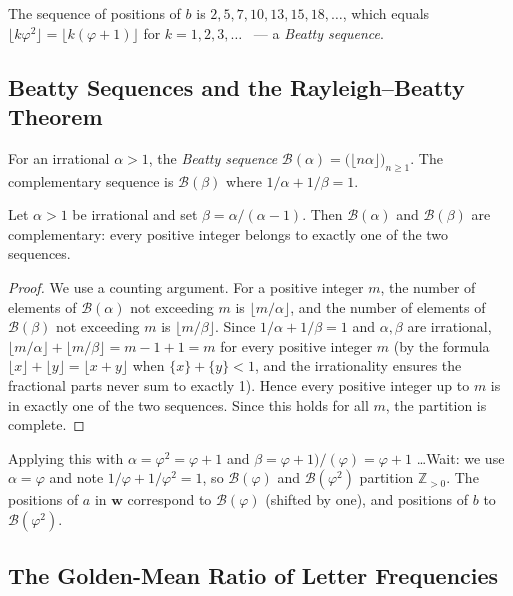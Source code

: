 The sequence of positions of \(b\) is \(2,5,7,10,13,15,18,\ldots\),
which equals \(\lfloor k\varphi^2 \rfloor = \lfloor k(\varphi+1) \rfloor\)
for \(k=1,2,3,\ldots\) \ — a \emph{Beatty sequence}.

\subsection{Beatty Sequences and the Rayleigh--Beatty Theorem}
\label{subsec:ch19-beatty}

For an irrational \(\alpha>1\), the \emph{Beatty sequence}
\(\mathcal{B}(\alpha) = \bigl(\lfloor n\alpha \rfloor\bigr)_{n\geq 1}\).
The complementary sequence is \(\mathcal{B}(\beta)\) where
\(1/\alpha + 1/\beta = 1\).

\begin{theorem}\label{thm:rayleigh-beatty}
  Let \(\alpha>1\) be irrational and set \(\beta = \alpha/(\alpha-1)\).
  Then \(\mathcal{B}(\alpha)\) and \(\mathcal{B}(\beta)\) are
  complementary: every positive integer belongs to exactly one of the
  two sequences.
\end{theorem}
\begin{proof}
  We use a counting argument.  For a positive integer \(m\), the number
  of elements of \(\mathcal{B}(\alpha)\) not exceeding \(m\) is
  \(\lfloor m/\alpha \rfloor\), and the number of elements of
  \(\mathcal{B}(\beta)\) not exceeding \(m\) is \(\lfloor m/\beta \rfloor\).
  Since \(1/\alpha+1/\beta=1\) and \(\alpha,\beta\) are irrational,
  \(\lfloor m/\alpha\rfloor + \lfloor m/\beta\rfloor = m-1+1 = m\)
  for every positive integer \(m\) (by the formula
  \(\lfloor x\rfloor+\lfloor y\rfloor = \lfloor x+y\rfloor\) when
  \(\{x\}+\{y\}<1\), and the irrationality ensures the fractional parts
  never sum to exactly 1).  Hence every positive integer up to \(m\)
  is in exactly one of the two sequences.  Since this holds for all
  \(m\), the partition is complete.
\end{proof}

Applying this with \(\alpha=\varphi^2=\varphi+1\) and
\(\beta=\varphi+1)/(\varphi)= \varphi+1\) \ldots Wait: we use
\(\alpha=\varphi\) and note \(1/\varphi+1/\varphi^2=1\), so
\(\mathcal{B}(\varphi)\) and \(\mathcal{B}(\varphi^2)\) partition
\(\mathbb{Z}_{>0}\).  The positions of \(a\) in \(\mathbf{w}\)
correspond to \(\mathcal{B}(\varphi)\) (shifted by one), and positions
of \(b\) to \(\mathcal{B}(\varphi^2)\).

\subsection{The Golden-Mean Ratio of Letter Frequencies}
\label{subsec:ch19-freq}

